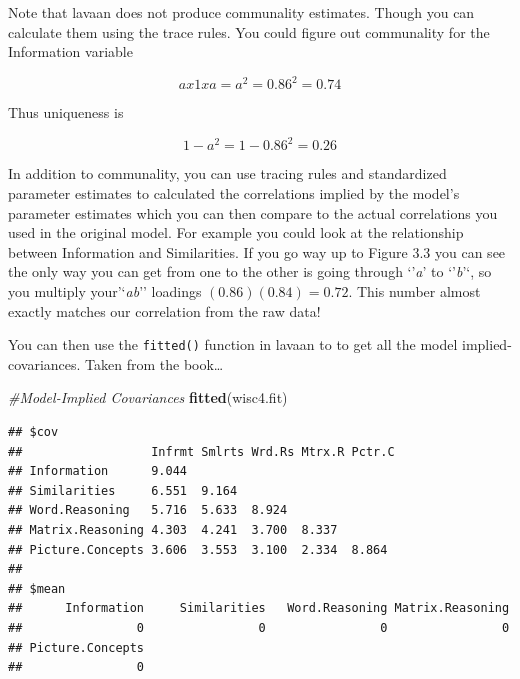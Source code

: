 \documentclass[]{book}
\newenvironment{Shaded}{\begin{snugshade}}{\end{snugshade}}
\newcommand{\KeywordTok}[1]{\textcolor[rgb]{0.13,0.29,0.53}{\textbf{#1}}}
\newcommand{\StringTok}[1]{\textcolor[rgb]{0.31,0.60,0.02}{#1}}
\newcommand{\CommentTok}[1]{\textcolor[rgb]{0.56,0.35,0.01}{\textit{#1}}}
\newcommand{\OperatorTok}[1]{\textcolor[rgb]{0.81,0.36,0.00}{\textbf{#1}}}
\newcommand{\NormalTok}[1]{#1}
\theoremstyle{definition}
\theoremstyle{definition}
\theoremstyle{definition}
\theoremstyle{remark}
\begin{document}
Note that lavaan does not produce communality estimates. Though you can
calculate them using the trace rules. You could figure out communality
for the Information variable

\[ a x 1 x a = a^2 = 0.86^2 = 0.74\]

Thus uniqueness is

\[ 1- a^2 = 1 - 0.86^2 = 0.26\]

In addition to communality, you can use tracing rules and standardized
parameter estimates to calculated the correlations implied by the
model's parameter estimates which you can then compare to the actual
correlations you used in the original model. For example you could look
at the relationship between Information and Similarities. If you go way
up to Figure 3.3 you can see the only way you can get from one to the
other is going through `'\emph{a}' to `'\emph{b}'`, so you multiply
your'`\emph{ab}'' loadings \((0.86)(0.84) = 0.72\). This number almost
exactly matches our correlation from the raw data!

You can then use the \texttt{fitted()} function in lavaan to to get all
the model implied-covariances. Taken from the book\ldots{}

\begin{Shaded}
\begin{Highlighting}[]
\CommentTok{#Model-Implied Covariances }
\KeywordTok{fitted}\NormalTok{(wisc4.fit)}
\end{Highlighting}
\end{Shaded}

\begin{verbatim}
## $cov
##                  Infrmt Smlrts Wrd.Rs Mtrx.R Pctr.C
## Information      9.044                             
## Similarities     6.551  9.164                      
## Word.Reasoning   5.716  5.633  8.924               
## Matrix.Reasoning 4.303  4.241  3.700  8.337        
## Picture.Concepts 3.606  3.553  3.100  2.334  8.864 
## 
## $mean
##      Information     Similarities   Word.Reasoning Matrix.Reasoning 
##                0                0                0                0 
## Picture.Concepts 
##                0
\end{verbatim}

\begin{Shaded}
\end{Shaded}
\end{document}
